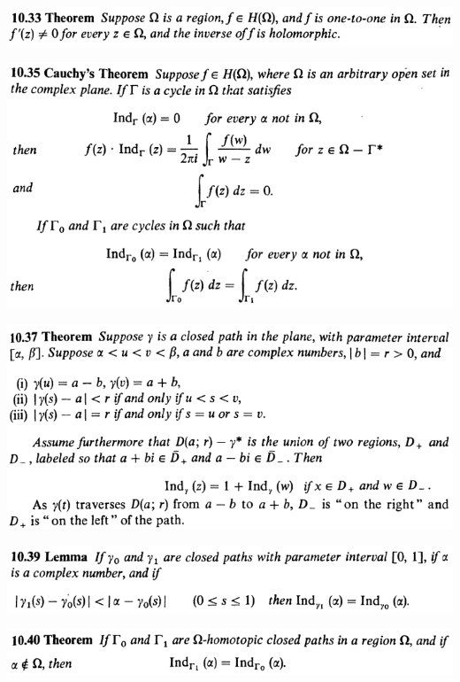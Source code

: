 \documentclass[12pt]{article}
\begin{document}
		\begin{center}
		\includegraphics{10ponto33}
		\end{center}

		\begin{center}
		\includegraphics{10ponto35}
		\end{center}

		\begin{center}
		\includegraphics{10ponto37}
		\end{center}

		\begin{center}
		\includegraphics{10ponto39}
		\end{center}

		\begin{center}
		\includegraphics{10ponto40}
		\end{center}
\end{document}
